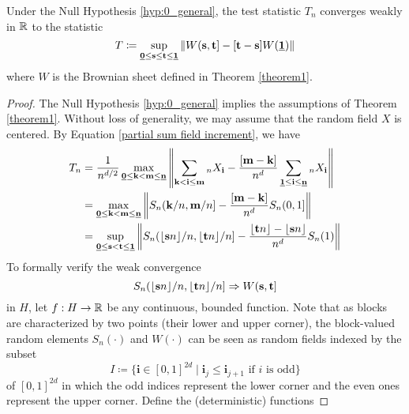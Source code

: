 \begin{corollary} \label{corollary:change in mean test}
    Under the Null Hypothesis \ref{hyp:0_general}, the test statistic $T_n$ converges weakly in $\mathbb{R}$ to the statistic
    \[ T \coloneqq \sup\limits_{\usbf[0] \leq \mathbf{s} \leq \mathbf{t} \leq \usbf[1]} \left\| W(\mathbf{s}, \mathbf{t}] - [\mathbf{t} - \mathbf{s}] W(\usbf[1]) \right\| \]
    where $W$ is the Brownian sheet defined in Theorem \ref{theorem1}. 
\end{corollary}
\begin{proof}
    The Null Hypothesis \ref{hyp:0_general} implies the assumptions of Theorem \ref{theorem1}.
    Without loss of generality, we may assume that the random field $X$ is centered. By Equation \eqref{partial sum field increment}, we have
    \begin{align*}
        T_n
        & = \frac{1}{n^{d/2}} \max\limits_{\usbf[0] \leq \mathbf{k} < \mathbf{m} \leq \usbf[n]} \left\| \sum\limits_{\mathbf{k} < \mathbf{i} \leq \mathbf{m}} {}_{n}X_\mathbf{i} - \frac{[\mathbf{m}-\mathbf{k}]}{n^d} \sum\limits_{\usbf[1] \leq \mathbf{i} \leq \usbf[n]} {}_{n}X_\mathbf{i} \right\| \\
        & = \max\limits_{\usbf[0] \leq \mathbf{k} < \mathbf{m} \leq \usbf[n]} \left\| S_n(\mathbf{k}/n, \mathbf{m}/n] - \frac{[\mathbf{m}-\mathbf{k}]}{n^d} S_n(0, 1] \right\| \\
        & = \sup\limits_{\usbf[0] \leq \mathbf{s} < \mathbf{t} \leq \usbf[1]} \left\| S_n(\floor{\mathbf{s} n}/n, \floor{\mathbf{t} n}/n] - \frac{\floor{\mathbf{t} n} - \floor{\mathbf{s} n }}{n^d} S_n(1) \right\|
    \end{align*}
    To formally verify the weak convergence
    \begin{equation} \label{corollary test statistic convergence proof: one weak convergence}
        S_n(\lfloor\mathbf{s} n\rfloor/n, \lfloor\mathbf{t} n\rfloor/n] \Rightarrow W(\mathbf{s}, \mathbf{t}] 
    \end{equation}
    in $H$, let $f: H \to \mathbb{R}$ be any continuous, bounded function.
    Note that as blocks are characterized by two points (their lower and upper corner), the block-valued random elements $S_n(\cdot)$ and $W(\cdot)$ can be seen as random fields indexed by the subset 
    \[ I \coloneqq \{ \mathbf{i} \in [0, 1]^{2d} \mid \mathbf{i}_j \leq \mathbf{i}_{j+1} \text{ if } i \text{ is odd} \} \]
    of $[0, 1]^{2d}$ in which the odd indices represent the lower corner and the even ones represent the upper corner.
    Define the (deterministic) functions

\end{proof}
